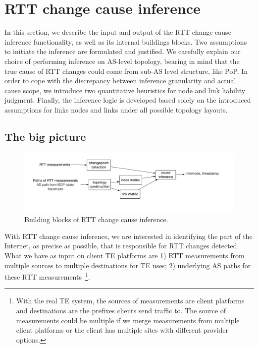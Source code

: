 \section{RTT change cause inference}
\label{sec:inference}
In this section, we describe the input and output of the RTT change cause inference functionality, as well as its internal buildings blocks. 
Two assumptions to initiate the inference are formulated and justified.
We carefully explain our choice of performing inference on AS-level topology, bearing in mind that the true cause of RTT changes could come from sub-AS level structure, like \ac{PoP}.
In order to cope with the discrepancy between inference granularity and actual cause scope, we introduce two quantitative heuristics for node and link liability judgment.
Finally, the inference logic is developed based solely on the introduced assumptions for links nodes and links under all possible topology layouts.

\subsection{The big picture}

\begin{figure}[!htb]
\centering
\includegraphics[width=1.2\textwidth]{gfx/chap5/sys_design.pdf}
\caption{Building blocks of RTT change cause inference.}
\label{fig:chap5_sys_design}
\end{figure}

With RTT change cause inference, we are interested in identifying the part of the Internet, as precise as possible, that is responsible for RTT changes detected. 
What we have as input on client TE platforms are 1) RTT measurements from multiple sources to multiple destinations for TE uses; 2) underlying AS paths for these RTT measurements~\footnote{With the real TE system, the sources of measurements are client platforms and destinations are the prefixes clients send traffic to. 
The source of measurements could be multiple if we merge measurements from multiple client platforms or the client has multiple sites with different provider options.}. 

